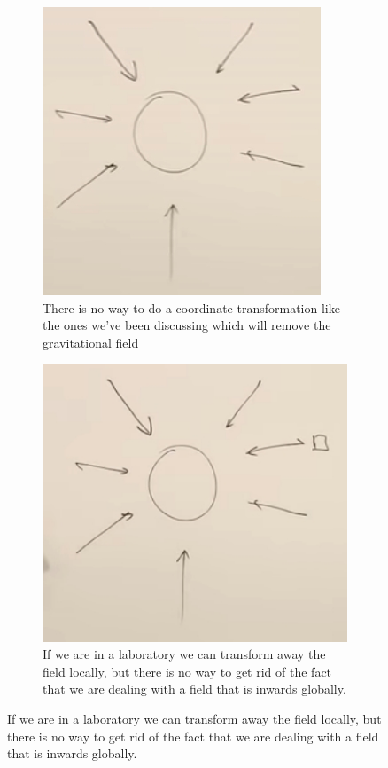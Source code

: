 \documentclass[]{article}
\begin{document}
\begin{figure}[H]
	\begin{center}
		\caption{Sun's Gravitational Field}
		\begin{subfigure}[t]{0.45\textwidth}
			\caption{There is no way to do a coordinate transformation like the ones we've 	been discussing which will remove the gravitational field}\label{fig:gr-1-suns-gravitational-field}
			\includegraphics[width=\textwidth]{gr-1-suns-gravitational-field}
		\end{subfigure}
		\;
		\begin{subfigure}[t]{0.45\textwidth}
			\caption{If we are in a laboratory we can transform away the field locally, but 	there is no way to get rid of the fact that we are dealing with a field that is inwards globally.}\label{fig:gr-1-suns-gravitational-field-local}
			\includegraphics[width=\textwidth]{gr-1-suns-gravitational-field-local}

\end{subfigure}
\end{center}
\end{figure}
\end{document}
